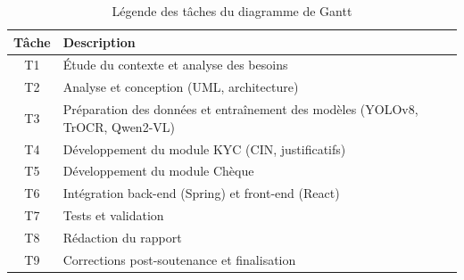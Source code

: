 %
%

\begin{table}[H]
\centering
\small
\begin{tabularx}{\textwidth}{|c|X|}
\hline
\textbf{Tâche} & \textbf{Description} \\
\hline
T1 & Étude du contexte et analyse des besoins \\
T2 & Analyse et conception (UML, architecture) \\
T3 & Préparation des données et entraînement des modèles (YOLOv8, TrOCR, Qwen2-VL) \\
T4 & Développement du module KYC (CIN, justificatifs) \\
T5 & Développement du module Chèque \\
T6 & Intégration back-end (Spring) et front-end (React) \\
T7 & Tests et validation \\
T8 & Rédaction du rapport \\
T9 & Corrections post-soutenance et finalisation \\
\hline
\end{tabularx}
\caption{Légende des tâches du diagramme de Gantt}
\label{tab:gantt_taches}
\end{table}

